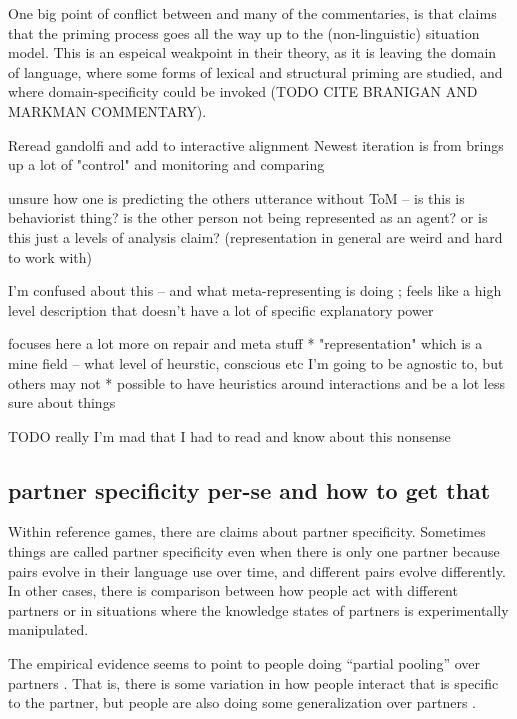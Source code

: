 \documentclass[]{article}
\begin{document}
One big point of conflict between \cite{pickering2004} and many of the commentaries, is that \cite{pickering2004} claims that the priming process goes all the way up to the (non-linguistic) situation model. This is an espeical weakpoint in their theory, as it is leaving the domain of language, where some forms of lexical and structural priming are studied, and where domain-specificity could be invoked (TODO CITE BRANIGAN AND MARKMAN COMMENTARY). 

Reread gandolfi and add to interactive alignment
Newest iteration is from \cite{gandolfi2022} brings up a lot of "control" and monitoring and comparing 

unsure how one is predicting the others utterance without ToM -- is this is behaviorist thing? is the other person not being represented as an agent? or is this just a levels of analysis claim? (representation in general are weird and hard to work with)

I'm confused about this -- and what meta-representing is doing ; feels like a high level description that doesn't have a lot of specific explanatory power

focuses here a lot more on repair and meta stuff 
* "representation" which is a mine field -- what level of heurstic, conscious etc I'm going to be agnostic to, but others may not
* possible to have heuristics around interactions and be a lot less sure about things

TODO really I'm mad that I had to read and know about this nonsense

\subsection{partner specificity per-se and how to get that}
Within reference games, there are claims about partner specificity. Sometimes things are called partner specificity even when there is only one partner because pairs evolve in their language use over time, and different pairs evolve differently. In other cases, there is comparison between how people act with different partners or in situations where the knowledge states of partners is experimentally manipulated. 

The empirical evidence seems to point to people doing ``partial pooling'' over partners \cite{hawkins2021}. That is, there is some variation in how people interact that is specific to the partner, but people are also doing some generalization over partners \cite{yoon2014}. 
\end{document}
